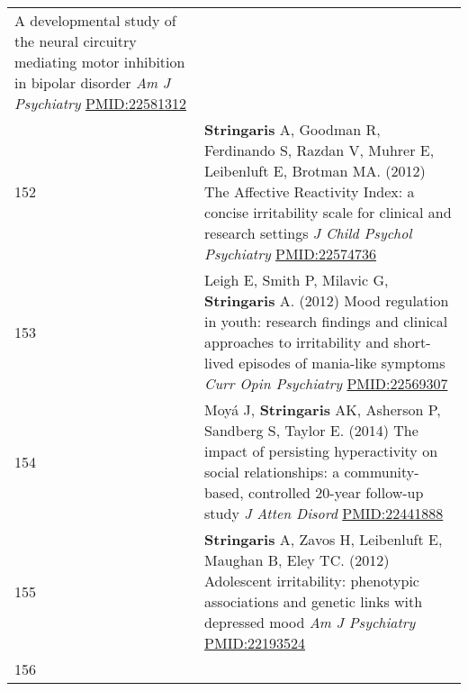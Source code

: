 \documentclass[
]{article}
\begin{document}
\begin{longtable}[]{@{}ll@{}}
\begin{minipage}[t]{0.94\columnwidth}
A developmental study of the neural circuitry mediating motor inhibition
in bipolar disorder \emph{Am J Psychiatry} \url{PMID:22581312}\strut
\end{minipage}\tabularnewline
\begin{minipage}[t]{0.01\columnwidth}\raggedright
152\strut
\end{minipage} & \begin{minipage}[t]{0.94\columnwidth}\raggedright
\textbf{Stringaris} A, Goodman R, Ferdinando S, Razdan V, Muhrer E,
Leibenluft E, Brotman MA. (2012) The Affective Reactivity Index: a
concise irritability scale for clinical and research settings \emph{J
Child Psychol Psychiatry} \url{PMID:22574736}\strut
\end{minipage}\tabularnewline
\begin{minipage}[t]{0.01\columnwidth}\raggedright
153\strut
\end{minipage} & \begin{minipage}[t]{0.94\columnwidth}\raggedright
Leigh E, Smith P, Milavic G, \textbf{Stringaris} A. (2012) Mood
regulation in youth: research findings and clinical approaches to
irritability and short-lived episodes of mania-like symptoms \emph{Curr
Opin Psychiatry} \url{PMID:22569307}\strut
\end{minipage}\tabularnewline
\begin{minipage}[t]{0.01\columnwidth}\raggedright
154\strut
\end{minipage} & \begin{minipage}[t]{0.94\columnwidth}\raggedright
Moyá J, \textbf{Stringaris} AK, Asherson P, Sandberg S, Taylor E. (2014)
The impact of persisting hyperactivity on social relationships: a
community-based, controlled 20-year follow-up study \emph{J Atten
Disord} \url{PMID:22441888}\strut
\end{minipage}\tabularnewline
\begin{minipage}[t]{0.01\columnwidth}\raggedright
155\strut
\end{minipage} & \begin{minipage}[t]{0.94\columnwidth}\raggedright
\textbf{Stringaris} A, Zavos H, Leibenluft E, Maughan B, Eley TC. (2012)
Adolescent irritability: phenotypic associations and genetic links with
depressed mood \emph{Am J Psychiatry} \url{PMID:22193524}\strut
\end{minipage}\tabularnewline
\begin{minipage}[t]{0.01\columnwidth}\raggedright
156\strut
\end{minipage} & \begin{minipage}[t]{0.94\columnwidth}\raggedright

\end{minipage}
\end{longtable}
\end{document}
